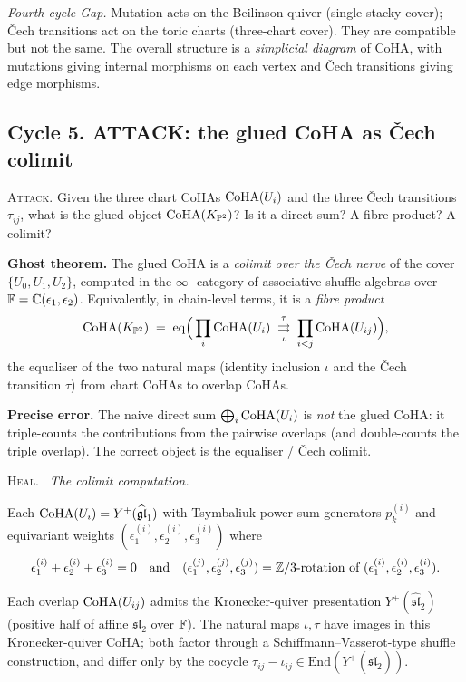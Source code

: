 \emph{Fourth cycle Gap.} Mutation acts on the Beilinson quiver (single
stacky cover); \v Cech transitions act on the toric charts (three-chart
cover). They are compatible but not the same. The overall structure is
a \emph{simplicial diagram} of CoHA, with mutations giving internal
morphisms on each vertex and \v Cech transitions giving edge morphisms.

\subsection*{Cycle 5. ATTACK: the glued CoHA as \v Cech colimit}

\textsc{Attack.} Given the three chart CoHAs $\mathrm{CoHA}(U_i)$ and the three
\v Cech transitions $\tau_{ij}$, what is the glued object
$\mathrm{CoHA}(K_{\mathbb{P}^2})$? Is it a direct sum? A fibre product? A colimit?

\textbf{Ghost theorem.} The glued CoHA is a \emph{colimit over the \v
Cech nerve} of the cover $\{U_0,U_1,U_2\}$, computed in the $\infty$-
category of associative shuffle algebras over $\mathbb{F}=\mathbb{C}(\epsilon_1,
\epsilon_2)$. Equivalently, in chain-level terms, it is a \emph{fibre
product}
\[
\mathrm{CoHA}(K_{\mathbb{P}^2})\;=\;\mathrm{eq}\Big(\prod_i\mathrm{CoHA}(U_i)
\;\overset{\tau}{\underset{\iota}\rightrightarrows}\;
\prod_{i<j}\mathrm{CoHA}(U_{ij})\Big),
\]
the equaliser of the two natural maps (identity inclusion $\iota$ and
the \v Cech transition $\tau$) from chart CoHAs to overlap CoHAs.

\textbf{Precise error.} The naive direct sum
$\bigoplus_i\mathrm{CoHA}(U_i)$ is \emph{not} the glued CoHA: it triple-counts
the contributions from the pairwise overlaps (and double-counts the
triple overlap). The correct object is the equaliser / \v Cech colimit.

\textsc{Heal.} \ClaimStatusDerivation\ \emph{The colimit computation.}

Each $\mathrm{CoHA}(U_i)=Y^+(\widehat{\mathfrak{gl}}_1)$ with Tsymbaliuk power-sum generators
$p_k^{(i)}$ and equivariant weights $(\epsilon_1^{(i)},\epsilon_2^{(i)},
\epsilon_3^{(i)})$ where
\[
\epsilon_1^{(i)}+\epsilon_2^{(i)}+\epsilon_3^{(i)}=0
\quad\text{and}\quad
(\epsilon_1^{(j)},\epsilon_2^{(j)},\epsilon_3^{(j)})=\mathbb{Z}/3\text{-rotation of }
(\epsilon_1^{(i)},\epsilon_2^{(i)},\epsilon_3^{(i)}).
\]

Each overlap $\mathrm{CoHA}(U_{ij})$ admits the Kronecker-quiver presentation
$Y^+(\widehat{\mathfrak{sl}}_2)$ (positive half of affine
$\mathfrak{sl}_2$ over $\mathbb{F}$). The natural maps $\iota,\tau$ have images
in this Kronecker-quiver CoHA; both factor through a
Schiffmann--Vasserot-type shuffle construction, and differ only by the
cocycle $\tau_{ij}-\iota_{ij}\in\mathrm{End}(Y^+(\widehat{\mathfrak{sl}}_2))$.

